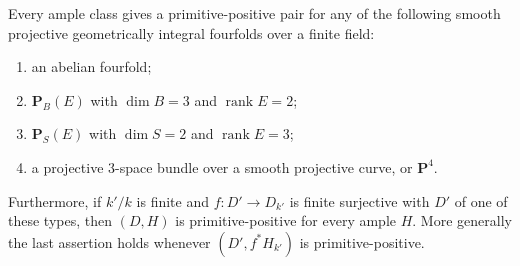 \begin{lemma}
\label{r16pos:types}
Every ample class gives a primitive-positive pair for any of the
following smooth projective geometrically integral fourfolds over
a finite field:
\begin{enumerate}
\item an abelian fourfold;
\item $\mathbf P_B(E)$ with $\dim B=3$ and $\operatorname{rank}E=2$;
\item $\mathbf P_S(E)$ with $\dim S=2$ and $\operatorname{rank}E=3$;
\item a projective $3$-space bundle over a smooth projective curve,
      or $\mathbf P^4$.
\end{enumerate}
Furthermore, if $k'/k$ is finite and
$f:D'\to D_{k'}$ is finite surjective with $D'$ of one of these
types, then $(D,H)$ is primitive-positive for every ample $H$.
More generally the last assertion holds whenever
$(D',f^*H_{k'})$ is primitive-positive.
\end{lemma}

